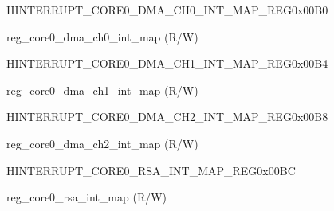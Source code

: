 \begin{register}{H}{INTERRUPT\_CORE0\_DMA\_CH0\_INT\_MAP\_REG}{0x00B0}\label{regdesc:INTERRUPTCORE0DMACH0INTMAPREG}
%
%
\regnewline%
\begin{regdesc}\begin{reglist}
\label{fielddesc:INTERRUPTCORE0DMACH0INTMAP}\item [INTERRUPT\_CORE0\_DMA\_CH0\_INT\_MAP] reg\_core0\_dma\_ch0\_int\_map (R/W)
\end{reglist}\end{regdesc}
\end{register}


\begin{register}{H}{INTERRUPT\_CORE0\_DMA\_CH1\_INT\_MAP\_REG}{0x00B4}\label{regdesc:INTERRUPTCORE0DMACH1INTMAPREG}
%
%
\regnewline%
\begin{regdesc}\begin{reglist}
\label{fielddesc:INTERRUPTCORE0DMACH1INTMAP}\item [INTERRUPT\_CORE0\_DMA\_CH1\_INT\_MAP] reg\_core0\_dma\_ch1\_int\_map (R/W)
\end{reglist}\end{regdesc}
\end{register}


\begin{register}{H}{INTERRUPT\_CORE0\_DMA\_CH2\_INT\_MAP\_REG}{0x00B8}\label{regdesc:INTERRUPTCORE0DMACH2INTMAPREG}
%
%
\regnewline%
\begin{regdesc}\begin{reglist}
\label{fielddesc:INTERRUPTCORE0DMACH2INTMAP}\item [INTERRUPT\_CORE0\_DMA\_CH2\_INT\_MAP] reg\_core0\_dma\_ch2\_int\_map (R/W)
\end{reglist}\end{regdesc}
\end{register}


\begin{register}{H}{INTERRUPT\_CORE0\_RSA\_INT\_MAP\_REG}{0x00BC}\label{regdesc:INTERRUPTCORE0RSAINTMAPREG}
%
%
\regnewline%
\begin{regdesc}\begin{reglist}
\label{fielddesc:INTERRUPTCORE0RSAINTMAP}\item [INTERRUPT\_CORE0\_RSA\_INT\_MAP] reg\_core0\_rsa\_int\_map (R/W)
\end{reglist}\end{regdesc}
\end{register}



